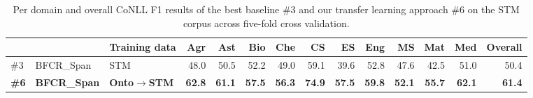 \documentclass[runningheads]{llncs}
\begin{document}
\begin{comment}
\begin{table}[tb]
\centering
\small
\caption{Results on the tests sets of the SciERC corpus~\cite{Luan2018MultiTaskIO} across 3 random restarts of the approaches: current state of the art of Luan et al., 
the best baseline approach (\#3), and our transfer learning approach (\#6). We report results using the whole and only $\frac{1}{5}$th of the training data of SciERC.}
\label{tab:coref_results_scierc}
\begin{tabular}{lll|rrr|rrr|rrr|rrr}
  &           &                & \multicolumn{3}{c}{$MUC$} & \multicolumn{3}{c}{$B^3$} & \multicolumn{3}{c}{$CEAFe_{\phi 4}$} & \multicolumn{3}{c}{$CoNLL$} \\
  &           & Training data  & P      & R      & F1     & P      & R     & F1    & P       & R      & F1     & P       & R      & F1     \\ \hline
\multicolumn{2}{l}{ Luan et al.~\cite{Luan2018MultiTaskIO}} & SciERC 
 & n/a	& n/a	& n/a & n/a	& n/a	& n/a & n/a	& n/a	& n/a & 52.0 & 44.9 & 48.2 \\ \hline
(\#3) & BFCR\_Span & SciERC 
& 63.6	& 57.1	& 60.2 & 62.1	& 54.8	& 58.2 & 64.3	& 55.2	& 59.4 & 63.3	& 55.7	& 59.3 \\ 
(\#6) & BFCR\_Span & OntoNotes$\rightarrow$
& 65.4	& 57.7	& 61.1 & 63.8	& 55.5	& 59.1 & 62.5	& 58.1	& 60.2 & 63.9	& 57.1	& 60.1 \\
      & (ours)           & SciERC \\
\hline
(\#3) & BFCR\_Span & $\frac{1}{5}$SciERC 
& 64.2	& 41.3	& 49.0 & 64.9	& 38.0	& 45.7 & 60.3	& 37.9	& 46.4 & 63.1	& 39.1	& 47.1 \\
(\#6) & BFCR\_Span & OntoNotes$\rightarrow$
& 53.3	& 57.1	& 54.7 & 51.9	& 56.2	& 53.2 & 53.2	& 56.7	& 54.7 & 52.8	& 56.7	& 54.2 \\
      & (ours)            & $\frac{1}{5}$SciERC
\end{tabular}
\end{table}
\end{comment}



\begin{table}[tb]
\centering
\small
\caption{
Per domain and overall CoNLL F1 results of the best baseline \#3 and our transfer learning approach \#6 on the STM corpus across five-fold cross validation.}
\label{tab:results_per_domain}
\begin{tabular}{lll|r|r|r|r|r|r|r|r|r|r|r}
 & &   Training data & Agr  & Ast  & Bio  & Che  & CS   & ES   & Eng  & MS   & Mat  & Med & Overall  \\ \hline
\#3 & BFCR\_Span & STM & 48.0 & 50.5	& 52.2	& 49.0	& 59.1	& 39.6	& 52.8	& 47.6	& 42.5	& 51.0 & 50.4 \\
\textbf{\#6} & \textbf{BFCR\_Span}  & \textbf{Onto$\rightarrow$STM} & \textbf{62.8} & \textbf{61.1} & \textbf{57.5} & \textbf{56.3} & \textbf{74.9} & \textbf{57.5} & \textbf{59.8} & \textbf{52.1} & \textbf{55.7} & \textbf{62.1} & \textbf{61.4}
\end{tabular}
\vspace{-1em}
\end{table}
\end{document}
